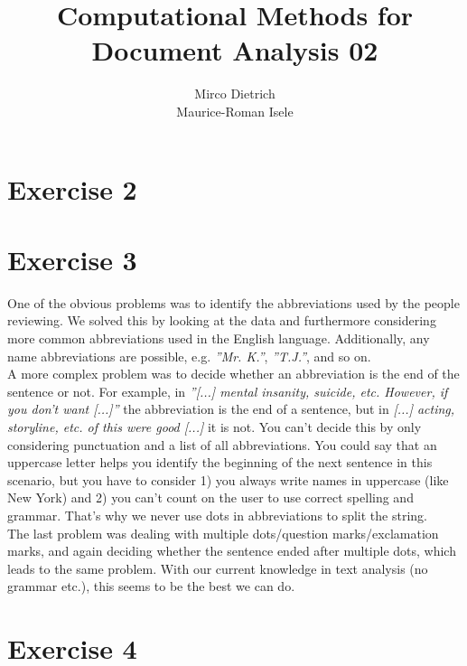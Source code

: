 \documentclass{article}
\title{Computational Methods for Document Analysis 02}
\author{Mirco Dietrich\\ Maurice-Roman Isele}
\begin{document}
\maketitle
\section*{Exercise 2}

\section*{Exercise 3}

One of the obvious problems was to identify the abbreviations used by the people reviewing. We solved this by looking at the data and furthermore considering more common abbreviations used in the English language. Additionally, any name abbreviations are possible, e.g. \textit{''Mr. K.''}, \textit{''T.J.''}, and so on. \\

A more complex problem was to decide whether an abbreviation is the end of the sentence or not. For example, in \textit{''[...] mental insanity, suicide, etc. However, if you don't want [...]''} the abbreviation is the end of a sentence, but in \textit{[...] acting, storyline, etc. of this were good [...]} it is not. You can't decide this by only considering punctuation and a list of all abbreviations. You could say that an uppercase letter helps you identify the beginning of the next sentence in this scenario, but you have to consider 1) you always write names in uppercase (like New York) and 2) you can't count on the user to use correct spelling and grammar. That's why we never use dots in abbreviations to split the string. \\

The last problem was dealing with multiple dots/question marks/exclamation marks, and again deciding whether the sentence ended after multiple dots, which leads to the same problem. With our current knowledge in text analysis (no grammar etc.), this seems to be the best we can do.

\section*{Exercise 4}
\end{document}
